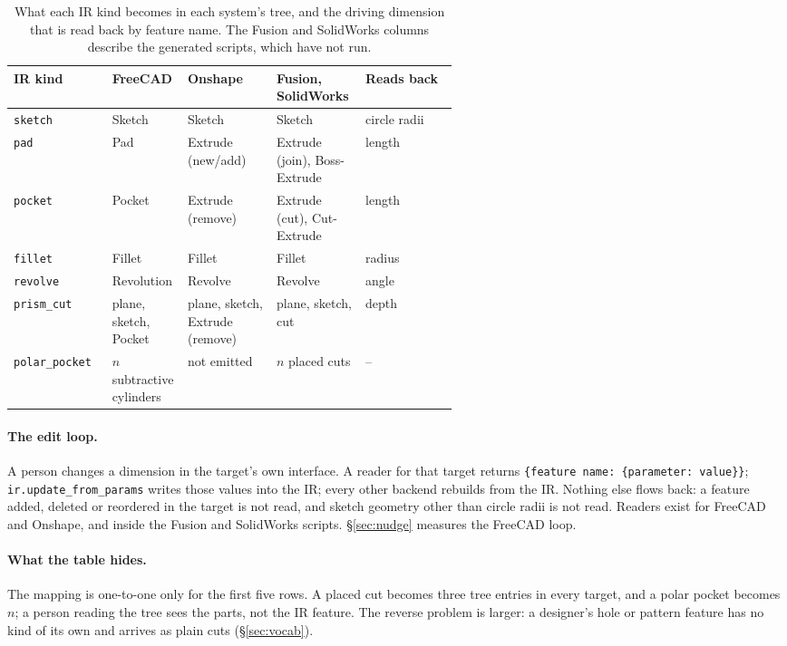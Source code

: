 \documentclass[11pt]{article}
\newcommand{\code}[1]{\texttt{\small #1}}
\begin{document}
\begin{table}[t]
\centering\footnotesize
\begin{tabular}{@{}lp{0.17\linewidth}p{0.2\linewidth}p{0.2\linewidth}l@{}}
\toprule
IR kind & FreeCAD & Onshape & Fusion, SolidWorks & Reads back \\
\midrule
\code{sketch} & Sketch & Sketch & Sketch & circle radii \\
\code{pad} & Pad & Extrude (new/add) & Extrude (join), Boss-Extrude & length \\
\code{pocket} & Pocket & Extrude (remove) & Extrude (cut), Cut-Extrude & length \\
\code{fillet} & Fillet & Fillet & Fillet & radius \\
\code{revolve} & Revolution & Revolve & Revolve & angle \\
\code{prism\_cut} & plane, sketch, Pocket & plane, sketch, Extrude (remove) & plane, sketch, cut & depth \\
\code{polar\_pocket} & $n$ subtractive cylinders & not emitted & $n$ placed cuts & -- \\
\bottomrule
\end{tabular}
\caption{What each IR kind becomes in each system's tree, and the driving
dimension that is read back by feature name. The Fusion and SolidWorks columns
describe the generated scripts, which have not run.}
\label{tab:timeline}
\end{table}

\paragraph{The edit loop.} A person changes a dimension in the target's own
interface. A reader for that target returns \code{\{feature name: \{parameter:
value\}\}}; \code{ir.update\_from\_params} writes those values into the IR; every
other backend rebuilds from the IR. Nothing else flows back: a feature added,
deleted or reordered in the target is not read, and sketch geometry other than
circle radii is not read. Readers exist for FreeCAD and Onshape, and inside the
Fusion and SolidWorks scripts. \S\ref{sec:nudge} measures the FreeCAD loop.

\paragraph{What the table hides.} The mapping is one-to-one only for the first
five rows. A placed cut becomes three tree entries in every target, and a polar
pocket becomes $n$; a person reading the tree sees the parts, not the IR
feature. The reverse problem is larger: a designer's hole or pattern feature has
no kind of its own and arrives as plain cuts (\S\ref{sec:vocab}).
\end{document}
